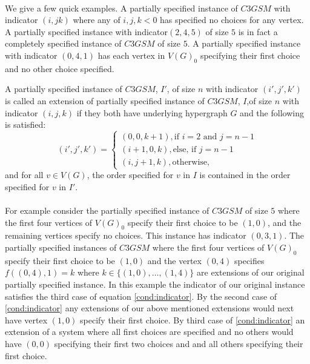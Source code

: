 \paragraph{}
We give a few quick examples. A partially specified instance of $C3GSM$ with indicator $(i,jk)$ where any of $i,j,k <0$ has specified no choices for any vertex. A partially specified instance with indicator$(2,4,5)$ of size $5$ is in fact a completely specified instance of $C3GSM$ of size $5$. A partially specified instance with indicator $(0,4,1)$ has each vertex in $V(G)_0$ specifying their first choice and no other choice specified.
\begin{definition}
A partially specified instance of $C3GSM$, $I'$, of size $n$ with indicator $(i',j',k')$ is called an extension of partially specified instance of $C3GSM$, $I$,of size $n$ with indicator $(i,j,k)$ if  they both have underlying hypergraph $G$ and the following is satisfied:
\begin{equation} \label{cond:indicator}
(i',j',k') = \begin{cases}
(0,0,k+1), \text{if $i=2$ and $j=n-1$} \\
(i+1, 0, k), \text{else, if $j = n-1$} \\
(i,j+1, k), \text{otherwise},
\end{cases}
\end{equation}
and for all $v \in V(G)$, the order specified for $v$  in $I$ is contained in the order specified for $v$ in $I'$.
\end{definition}
\paragraph{}
For example consider the partially specified instance of $C3GSM$ of size $5$ where the first four vertices of $V(G)_0$ specify their first choice to be $(1,0)$, and the remaining vertices specify no choices. This instance has indicator $(0,3,1)$. The partially specified instances of $C3GSM$ where the first four vertices of $V(G)_0$ specify their first choice to be $(1,0)$ and the vertex $(0,4)$ specifies $f((0,4),1) = k$ where $k \in \{(1,0), \dots, (1,4)\}$ are extensions of our original partially specified instance. In this example the indicator of our original instance satisfies the third case of equation \ref{cond:indicator}. By the second case of \ref{cond:indicator} any extensions of our above mentioned extensions would next have vertex $(1,0)$ specify their first choice. By third case of \ref{cond:indicator} an extension of a system where all first choices are specified and no others would have $(0,0)$ specifying their first two choices and and all others specifying their first choice.
